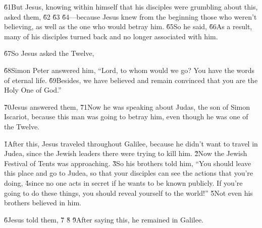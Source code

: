 \v{61}But Jesus, knowing within himself that his disciples were grumbling about this, asked them,  \v{62} \v{63} \v{64}---because Jesus knew from the beginning those who weren't believing, as well as the one who would betray him. \v{65}So he said,  \v{66}As a result, many of his disciples turned back and no longer associated with him.

\v{67}So Jesus asked the Twelve, 

\v{68}Simon Peter answered him, ``Lord, to whom would we go? You have the words of eternal life. \v{69}Besides, we have believed and remain convinced that you are the Holy One of God.''

\v{70}Jesus answered them,  \v{71}Now he was speaking about Judas, the son of Simon Iscariot, because this man was going to betray him, even though he was one of the Twelve.

\v{1}After this, Jesus traveled throughout Galilee, because he didn't want to travel in Judea, since the Jewish leaders there were trying to kill him. \v{2}Now the Jewish Festival of Tents was approaching. \v{3}So his brothers told him, ``You should leave this place and go to Judea, so that your disciples can see the actions that you're doing, \v{4}since no one acts in secret if he wants to be known publicly. If you're going to do these things, you should reveal yourself to the world!'' \v{5}Not even his brothers believed in him.

\v{6}Jesus told them,  \v{7} \v{8} \red{,} \v{9}After saying this, he remained in Galilee.

